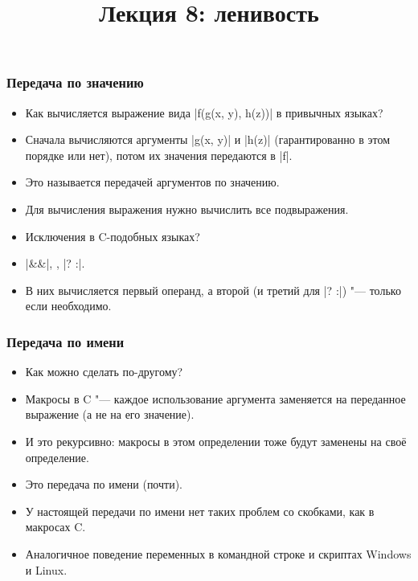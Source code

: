 \documentclass[11pt]{beamer}
\title{Лекция 8: ленивость}
\begin{document}
\begin{frame}[plain]
  \maketitle
\end{frame}

\begin{frame}[fragile]
  \frametitle{Передача по значению}
  \begin{itemize}
    \item Как вычисляется выражение вида \haskinline|f(g(x, y), h(z))| в привычных языках?
          \pause
    \item Сначала вычисляются аргументы \haskinline|g(x, y)| и \haskinline|h(z)| (гарантированно в этом порядке или нет), потом их значения передаются в \haskinline|f|.
    \item Это называется передачей аргументов по значению.
    \item Для вычисления выражения нужно вычислить все подвыражения.
    \item Исключения в C-подобных языках?
          \pause
    \item \haskinline|&&|, \haskinline{||}, \haskinline|? :|.
          \pause
    \item В них вычисляется первый операнд, а второй (и третий для \haskinline|? :|) "--- только если необходимо.
  \end{itemize}
\end{frame}

\begin{frame}[fragile]
  \frametitle{Передача по имени}
  \begin{itemize}
    \item Как можно сделать по-другому?
          \pause
    \item Макросы в C "--- каждое использование аргумента заменяется на переданное выражение (а не на его значение).
    \item И это рекурсивно: макросы в этом определении тоже будут заменены на своё определение.
    \item Это передача по имени (почти).
          \pause
    \item У настоящей передачи по имени нет таких проблем со скобками, как в макросах C.
          \pause
    \item Аналогичное поведение переменных в командной строке и скриптах Windows и Linux.
  \end{itemize}
\end{frame}
\end{document}
